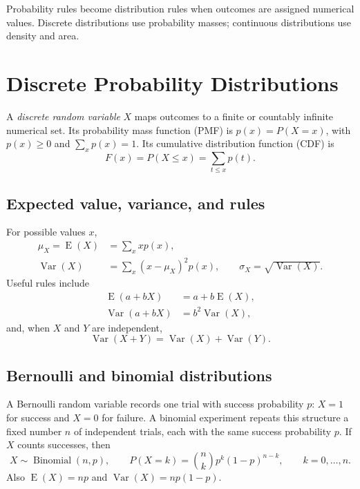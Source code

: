 \documentclass[11pt]{article}
\newcommand{\E}{\operatorname{E}}
\newcommand{\Var}{\operatorname{Var}}
\begin{document}
\begin{keybox}
Probability rules become distribution rules when outcomes are assigned
numerical values.  Discrete distributions use probability masses; continuous
distributions use density and area.
\end{keybox}

\section{Discrete Probability Distributions}\label{sec:discrete}
A \emph{discrete random variable} $X$ maps outcomes to a finite or countably
infinite numerical set.  Its probability mass function (PMF) is
$p(x)=P(X=x)$, with $p(x)\ge0$ and $\sum_xp(x)=1$.  Its cumulative
distribution function (CDF) is
\begin{equation}\label{eq:disc-cdf}
F(x)=P(X\le x)=\sum_{t\le x}p(t).
\end{equation}

\subsection{Expected value, variance, and rules}
For possible values $x$,
\begin{align}
\mu_X=\E(X)&=\sum_x x p(x),\label{eq:disc-mean}\\
\Var(X)&=\sum_x(x-\mu_X)^2p(x),\qquad
\sigma_X=\sqrt{\Var(X)}.\label{eq:disc-var}
\end{align}
Useful rules include
\begin{align}
\E(a+bX)&=a+b\E(X),\label{eq:expect-transform}\\
\Var(a+bX)&=b^2\Var(X),\label{eq:var-transform}
\end{align}
and, when $X$ and $Y$ are independent,
\begin{equation}\label{eq:var-sum}
\Var(X+Y)=\Var(X)+\Var(Y).
\end{equation}

\subsection{Bernoulli and binomial distributions}
A Bernoulli random variable records one trial with success probability $p$:
$X=1$ for success and $X=0$ for failure.  A binomial experiment repeats this
structure a fixed number $n$ of independent trials, each with the same
success probability $p$.  If $X$ counts successes, then
\begin{equation}\label{eq:binomial}
X\sim\operatorname{Binomial}(n,p),\qquad
P(X=k)=\binom nk p^k(1-p)^{n-k},\qquad k=0,\ldots,n.
\end{equation}
Also $\E(X)=np$ and $\Var(X)=np(1-p)$.
\end{document}
